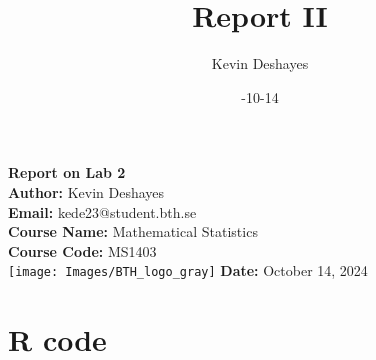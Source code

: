 \documentclass{report}
\title{Report II}
\author{Kevin Deshayes}
\date{\2024-10-14}
\begin{document}
\begin{titlepage}
    \centering
    {\huge\bfseries Report on Lab 2 \\[1cm]}  %
    \textbf{Author:} Kevin Deshayes\\[0.5cm]  %
    \textbf{Email:} kede23@student.bth.se\\[0.5cm]  %
    \textbf{Course Name:} Mathematical Statistics \\[0.5cm]  %
    \textbf{Course Code:} MS1403\\[1.5cm]  %
    \texttt{[image: Images/BTH\_logo\_gray]} %
    \vfill
    \textbf{Date:} October 14, 2024  %
    \vspace{2cm}
\end{titlepage}

\tableofcontents
\newpage
\section{R code}\label{sec:r-code}

\end{document}
